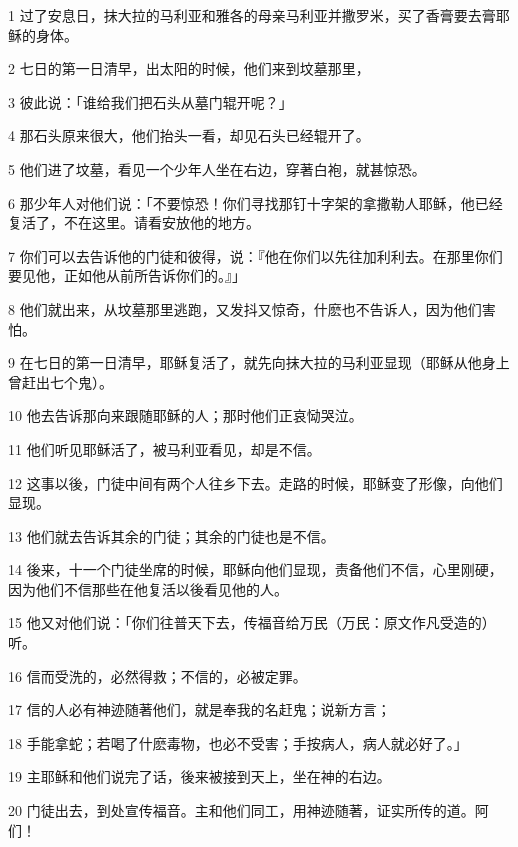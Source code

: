 \par 1 过了安息日，抹大拉的马利亚和雅各的母亲马利亚并撒罗米，买了香膏要去膏耶稣的身体。
\par 2 七日的第一日清早，出太阳的时候，他们来到坟墓那里，
\par 3 彼此说：「谁给我们把石头从墓门辊开呢？」
\par 4 那石头原来很大，他们抬头一看，却见石头已经辊开了。
\par 5 他们进了坟墓，看见一个少年人坐在右边，穿著白袍，就甚惊恐。
\par 6 那少年人对他们说：「不要惊恐！你们寻找那钉十字架的拿撒勒人耶稣，他已经复活了，不在这里。请看安放他的地方。
\par 7 你们可以去告诉他的门徒和彼得，说：『他在你们以先往加利利去。在那里你们要见他，正如他从前所告诉你们的。』」
\par 8 他们就出来，从坟墓那里逃跑，又发抖又惊奇，什麽也不告诉人，因为他们害怕。
\par 9 在七日的第一日清早，耶稣复活了，就先向抹大拉的马利亚显现（耶稣从他身上曾赶出七个鬼）。
\par 10 他去告诉那向来跟随耶稣的人；那时他们正哀恸哭泣。
\par 11 他们听见耶稣活了，被马利亚看见，却是不信。
\par 12 这事以後，门徒中间有两个人往乡下去。走路的时候，耶稣变了形像，向他们显现。
\par 13 他们就去告诉其余的门徒；其余的门徒也是不信。
\par 14 後来，十一个门徒坐席的时候，耶稣向他们显现，责备他们不信，心里刚硬，因为他们不信那些在他复活以後看见他的人。
\par 15 他又对他们说：「你们往普天下去，传福音给万民（万民：原文作凡受造的）听。
\par 16 信而受洗的，必然得救；不信的，必被定罪。
\par 17 信的人必有神迹随著他们，就是奉我的名赶鬼；说新方言；
\par 18 手能拿蛇；若喝了什麽毒物，也必不受害；手按病人，病人就必好了。」
\par 19 主耶稣和他们说完了话，後来被接到天上，坐在神的右边。
\par 20 门徒出去，到处宣传福音。主和他们同工，用神迹随著，证实所传的道。阿们！


